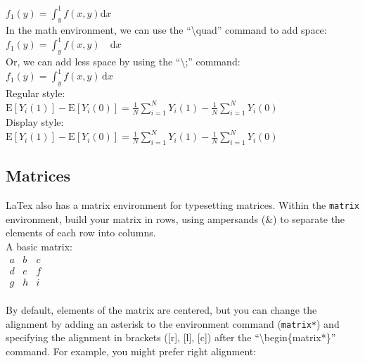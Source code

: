 \documentclass[12pt,notitlepage]{article}		%
\begin{document}
$f_1(y) = \displaystyle{\int_{y}^{1} f(x, y) \textrm{d}x}$\\

In the math environment, we can use the ``\textbackslash quad'' command to add space:\\

$f_1(y) = \displaystyle{\int_{y}^{1} f(x, y) \quad \textrm{d}x}$\\

Or, we can add less space by using the ``\textbackslash ;'' command:\\

$f_1(y) = \displaystyle{\int_{y}^{1} f(x, y) \, \textrm{d}x}$\\


Regular style:\\

$\textrm{E}[Y_i(1)] - \textrm{E}[Y_i(0)] = \frac{1}{N} \sum_{i=1}^N Y_i(1) - \frac{1}{N} \sum_{i=1}^N Y_i(0) $\\

Display style:\\

$\textrm{E}[Y_i(1)] - \textrm{E}[Y_i(0)] = \displaystyle{\frac{1}{N} \sum_{i=1}^N Y_i(1) - \frac{1}{N} \sum_{i=1}^N Y_i(0) }$\\

\subsection{Matrices}

LaTex also has a matrix environment for typesetting matrices.  Within the \texttt{matrix} environment, build your matrix in rows, using ampersands (\&) to separate the elements of each row into columns. \\

A basic matrix:\\

$\begin{matrix}
  a & b & c \\
  d & e & f \\
  g & h & i
 \end{matrix}$\\\\
 
 By default, elements of the matrix are centered, but you can change the alignment by adding an asterisk to the environment command  (\texttt{matrix*}) and specifying the alignment in brackets ([r], [l], [c]) after the ``\textbackslash begin\{matrix*\}'' command.  For example, you might prefer right alignment:\\
 
\end{document}
